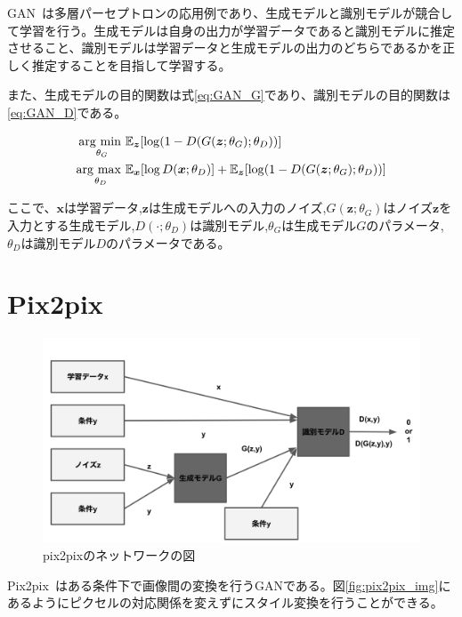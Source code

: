 GAN~\cite{GAN}は多層パーセプトロンの応用例であり、生成モデルと識別モデルが競合して学習を行う。生成モデルは自身の出力が学習データであると識別モデルに推定させること、識別モデルは学習データと生成モデルの出力のどちらであるかを正しく推定することを目指して学習する。

また、生成モデルの目的関数は式\ref{eq:GAN_G}であり、識別モデルの目的関数は\ref{eq:GAN_D}である。

\begin{align}
    \label{eq:GAN_G}
    \mathop{\rm arg~min~}\limits _{\theta_G}& \mathbb{E}_{\boldsymbol{z}}[\log (1-D(G(\boldsymbol{z};\theta_G);\theta_D))]\\
    \label{eq:GAN_D}
    \mathop{\rm arg~max~}\limits _{\theta_D}& \mathbb{E}_{\boldsymbol{x}}[\log D(\boldsymbol{x};\theta_D)]+\mathbb{E}_{\boldsymbol{z}}[\log (1-D(G(\boldsymbol{z};\theta_G);\theta_D))]
\end{align}

ここで、$\boldsymbol{x}$は学習データ,$\boldsymbol{z}$は生成モデルへの入力のノイズ,$G(\boldsymbol{z};\theta_G)$はノイズ$\boldsymbol{z}$を入力とする生成モデル,$D(\cdot;\theta_D)$は識別モデル,$\theta_G$は生成モデル$G$のパラメータ,$\theta_D$は識別モデル$D$のパラメータである。



\section{Pix2pix}

\begin{figure}[H]
\begin{center}
\includegraphics[width=\hsize]{figure/pix2pix_net.png}
\caption{pix2pixのネットワークの図}
\label{fig:pix2pix_net}
\end{center}
\end{figure}

Pix2pix~\cite{pix2pix}はある条件下で画像間の変換を行うGANである。図\ref{fig:pix2pix_img}にあるようにピクセルの対応関係を変えずにスタイル変換を行うことができる。

